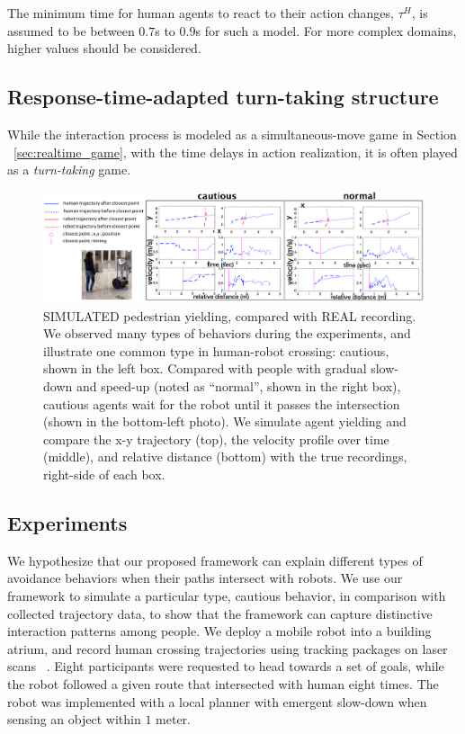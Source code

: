 \documentclass[letterpaper, 10 pt, conference]{ieeeconf}  %
\begin{document}
The minimum time for human agents to react to their action changes, $\tau^H$, is assumed to be between $0.7$s to $0.9$s for such a model. For more complex domains, higher values should be considered.

\subsection{Response-time-adapted turn-taking structure}
While the interaction process is modeled as a simultaneous-move game in Section ~\ref{sec:realtime_game}, with the time delays in action realization, it is often played as a \textit{turn-taking} game. 

\begin{figure}[t]
      \vspace{-1em}
      \centering
      \hspace{-5em}
      \vspace{-1em}
      \includegraphics[scale=0.48]{iros_exp}
      \hspace{-5em}
      \caption{SIMULATED pedestrian yielding, compared with REAL recording. We observed many types of behaviors during the experiments, and illustrate one common type in human-robot crossing: cautious, shown in the left box. Compared with people with gradual slow-down and speed-up (noted as ``normal'', shown in the right box), cautious agents wait for the robot until it passes the intersection (shown in the bottom-left photo). We simulate agent yielding and compare the x-y trajectory (top), the velocity profile over time (middle), and relative distance (bottom) with the true recordings, right-side of each box.}
      \vspace{-1.7em}
     \label{fig:cautious_recording}
\end{figure}

\subsection{Experiments}
We hypothesize that our proposed framework can explain different types of avoidance behaviors when their paths intersect with robots. We use our framework to simulate a particular type, cautious behavior, in comparison with collected trajectory data, to show that the framework can capture distinctive interaction patterns among people. We deploy a mobile robot into a building atrium, and record human crossing trajectories using tracking packages on laser scans ~\cite{leigh2015person}. Eight participants were requested to head towards a set of goals, while the robot followed a given route that intersected with human eight times. The robot was implemented with a local planner with emergent slow-down when sensing an object within $1$ meter. 
\end{document}
